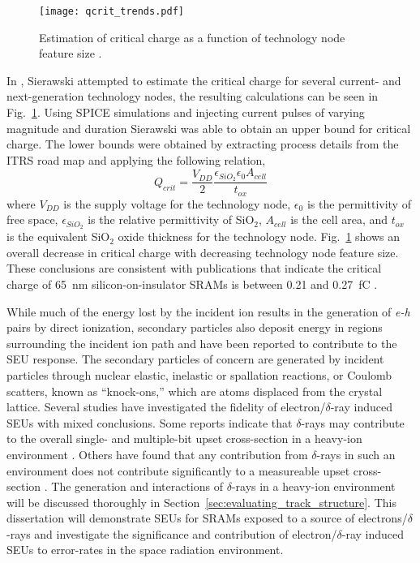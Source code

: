 \begin{figure}[tb]
    \begin{center}
        \texttt{[image: qcrit\_trends.pdf]}
    \end{center}
    \caption[Estimation of critical charge as a function of technology node feature size.]{Estimation of critical charge as a function of technology node feature size \cite{Sierawski:2011tc}.}
    \label{fig:qcrit_trends}
\end{figure}

In \cite{Sierawski:2011tc}, Sierawski attempted to estimate the critical charge for several current- and next-generation technology nodes, the resulting calculations can be seen in Fig.~\ref{fig:qcrit_trends}.
Using SPICE simulations and injecting current pulses of varying magnitude and duration Sierawski was able to obtain an upper bound for critical charge.
The lower bounds were obtained by extracting process details from the ITRS road map \cite{itrs:2012} and applying the following relation,
\begin{equation}
    \label{eq:qcrit}
    Q_{crit} = \frac{V_{DD}}{2}\frac{\epsilon_{SiO_2} \epsilon_0 A_{cell}}{t_{ox}}
\end{equation}
where $V_{DD}$ is the supply voltage for the technology node, $\epsilon_{0}$ is the permittivity of free space, $\epsilon_{SiO_2}$ is the relative permittivity of SiO$_2$, $A_{cell}$ is the cell area, and $t_{ox}$ is the equivalent SiO$_2$ oxide thickness for the technology node.
Fig.~\ref{fig:qcrit_trends} shows an overall decrease in critical charge with decreasing technology node feature size.
These conclusions are consistent with publications that indicate the critical charge of 65~nm silicon-on-insulator SRAMs is between 0.21 and 0.27~fC \cite{Rodbell:2007vl}.

While much of the energy lost by the incident ion results in the generation of \emph{e-h} pairs by direct ionization, secondary particles also deposit energy in regions surrounding the incident ion path and have been reported to contribute to the SEU response.
The secondary particles of concern are generated by incident particles through nuclear elastic, inelastic or spallation reactions, or Coulomb scatters, known as ``knock-ons,'' which are atoms displaced from the crystal lattice.
Several studies have investigated the fidelity of electron/$\delta$-ray induced SEUs with mixed conclusions.
Some reports indicate that $\delta$-rays may contribute to the overall single- and multiple-bit upset cross-section in a heavy-ion environment \cite{King:2010cu,King:2012cb}.
Others have found that any contribution from $\delta$-rays in such an environment does not contribute significantly to a measureable upset cross-section \cite{Raine:gk,Raine:2012gi,Barak:2012im}.
The generation and interactions of $\delta$-rays in a heavy-ion environment will be discussed thoroughly in Section~\ref{sec:evaluating_track_structure}.
This dissertation will demonstrate SEUs for SRAMs exposed to a source of electrons/$\delta$-rays and investigate the significance and contribution of electron/$\delta$-ray induced SEUs to error-rates in the space radiation environment.

